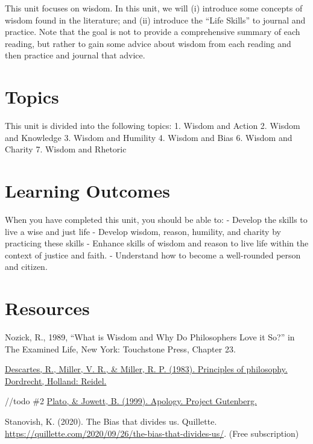 \documentclass[
]{book}
\begin{document}
This unit focuses on wisdom. In this unit, we will (i) introduce some concepts of wisdom found in the literature; and (ii) introduce the ``Life Skills'' to journal and practice. Note that the goal is not to provide a comprehensive summary of each reading, but rather to gain some advice about wisdom from each reading and then practice and journal that advice.

\hypertarget{topics}{%
\section{Topics}\label{topics}}

This unit is divided into the following topics:
1. Wisdom and Action
2. Wisdom and Knowledge
3. Wisdom and Humility
4. Wisdom and Bias
6. Wisdom and Charity
7. Wisdom and Rhetoric

\hypertarget{learning-outcomes}{%
\section{Learning Outcomes}\label{learning-outcomes}}

When you have completed this unit, you should be able to:
- Develop the skills to live a wise and just life
- Develop wisdom, reason, humility, and charity by practicing these skills
- Enhance skills of wisdom and reason to live life within the context of justice and faith.
- Understand how to become a well-rounded person and citizen.

\hypertarget{resources}{%
\section{Resources}\label{resources}}

Nozick, R., 1989, ``What is Wisdom and Why Do Philosophers Love it So?'' in The Examined Life, New York: Touchstone Press, Chapter 23.

\href{https://www.earlymoderntexts.com/assets/pdfs/descartes1644part1.pdf}{Descartes, R., Miller, V. R., \& Miller, R. P. (1983). Principles of philosophy. Dordrecht, Holland: Reidel.}

//todo \#2
\href{https://twu.idm.oclc.org/login?url=https://search.ebscohost.com/login.aspx?direct=true\&db=nlebk\&AN=1085368\&site=eds-live\&scope=site\&ebv=EB\&ppid=pp_1}{Plato, \& Jowett, B. (1999). Apology. Project Gutenberg.}

Stanovish, K. (2020). The Bias that divides us. Quillette. \url{https://quillette.com/2020/09/26/the-bias-that-divides-us/}. (Free subscription)
\end{document}
